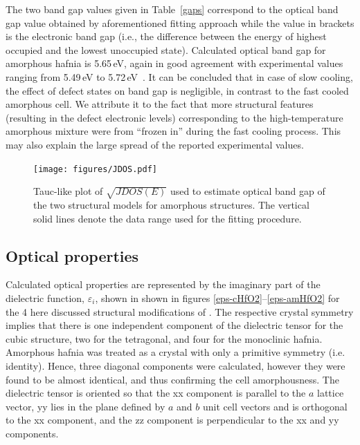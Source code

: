 \documentclass[10pt,a4paper,twocolumn]{article}
\begin{document}
The two band gap values given in Table~\ref{gaps} correspond to the optical band gap value obtained by aforementioned fitting approach while the value in brackets is the electronic band gap (i.e., the difference between the energy of highest occupied and the lowest unoccupied state).
Calculated optical band gap for amorphous hafnia is 5.65\,eV, again in good agreement with experimental values ranging from 5.49\,eV to 5.72\,eV~\cite{Takeuchi2004, Nguyen2005, Perevalov2007}.
It can be concluded that in case of slow cooling, the effect of defect states on band gap is negligible, in contrast to the fast cooled amorphous cell. We attribute it to the fact that more structural features (resulting in the defect electronic levels) corresponding to the high-temperature amorphous mixture were from ``frozen in'' during the fast cooling process.
This may also explain the large spread of the reported experimental values.

\begin{figure}
\begin{center}
	\texttt{[image: figures/JDOS.pdf]}
	\caption{Tauc-like plot of $\sqrt{JDOS(E)}$ used to estimate optical band gap of the two structural models for amorphous structures. The vertical solid lines denote the data range used for the fitting procedure.}
   \label{JDOS}
\end{center}
\end{figure}



\subsection{Optical properties}

Calculated optical properties are represented by the imaginary part of the dielectric function, $\varepsilon_i$, shown in shown in figures \ref{eps-cHfO2}--\ref{eps-amHfO2} for the 4 here discussed structural modifications of .
The respective crystal symmetry implies that there is one independent component of the dielectric tensor for the cubic structure, two for the tetragonal, and four for the monoclinic hafnia.
Amorphous hafnia was treated as a crystal with only a primitive symmetry (i.e. identity). 
Hence, three diagonal components were calculated, however they were found to be almost identical, and thus confirming the cell amorphousness.
The dielectric tensor is oriented so that the xx component is parallel to the $a$ lattice vector, yy lies in the plane defined by $a$ and $b$ unit cell vectors and is orthogonal to the xx component, and the zz component is perpendicular to the xx and yy components.
\end{document}
